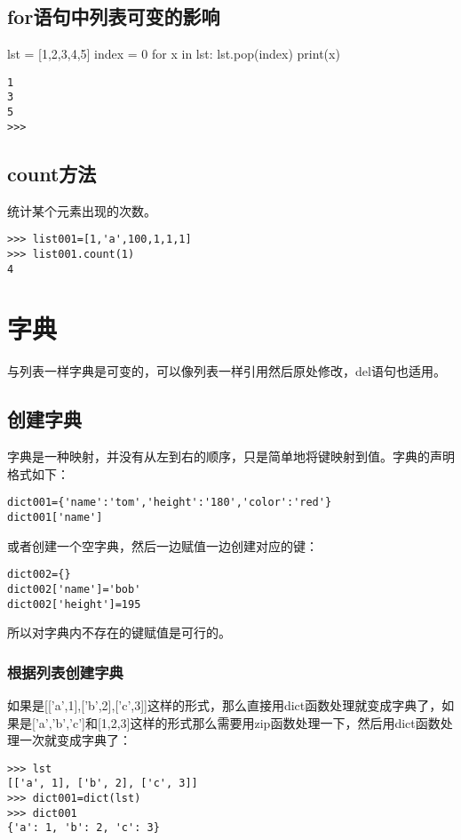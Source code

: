 \documentclass[12pt,oneside]{book}
\begin{document}
\begin{common-format}
\subsection{for语句中列表可变的影响}
\begin{tcbpython}[]
lst = [1,2,3,4,5]
index = 0
for x in lst:
    lst.pop(index)
    print(x)
\end{tcbpython}

\begin{Verbatim}
1
3
5
>>> 
\end{Verbatim}





\subsection{count方法}
统计某个元素出现的次数。
\begin{Verbatim}
>>> list001=[1,'a',100,1,1,1]
>>> list001.count(1)
4
\end{Verbatim}




\section{字典}
与列表一样字典是可变的，可以像列表一样引用然后原处修改，del语句也适用。

\subsection{创建字典}
字典是一种映射，并没有从左到右的顺序，只是简单地将键映射到值。字典的声明格式如下：
\begin{Verbatim}
dict001={'name':'tom','height':'180','color':'red'}
dict001['name']
\end{Verbatim}

或者创建一个空字典，然后一边赋值一边创建对应的键：
\begin{Verbatim}
dict002={}
dict002['name']='bob'
dict002['height']=195
\end{Verbatim}

所以对字典内不存在的键赋值是可行的。

\subsubsection{根据列表创建字典}
如果是[['a',1],['b',2],['c',3]]这样的形式，那么直接用dict函数处理就变成字典了，如果是['a','b','c']和[1,2,3]这样的形式那么需要用zip函数处理一下，然后用dict函数处理一次就变成字典了：
\begin{Verbatim}
>>> lst
[['a', 1], ['b', 2], ['c', 3]]
>>> dict001=dict(lst)
>>> dict001
{'a': 1, 'b': 2, 'c': 3}
\end{Verbatim}


\end{common-format}
\end{document}
